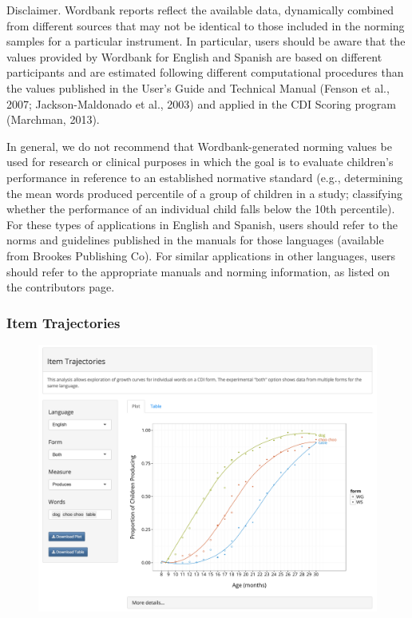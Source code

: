 \documentclass[man,noapacite]{apa2}
\begin{document}
Disclaimer. Wordbank reports reflect the available data, dynamically combined from different sources that may not be identical to those included in the norming samples for a particular instrument. In particular, users should be aware that the values provided by Wordbank for English and Spanish are based on different participants and are estimated following different computational procedures than the values published in the User’s Guide and Technical Manual (Fenson et al., 2007; Jackson-Maldonado et al., 2003) and applied in the CDI Scoring program (Marchman, 2013).

In general, we do not recommend that Wordbank-generated norming values be used for research or clinical purposes in which the goal is to evaluate children's performance in reference to an established normative standard (e.g., determining the mean words produced percentile of a group of children in a study; classifying whether the performance of an individual child falls below the 10th percentile). For these types of applications in English and Spanish, users should refer to the norms and guidelines published in the manuals for those languages (available from Brookes Publishing Co). For similar applications in other languages, users should refer to the appropriate manuals and norming information, as listed on the contributors page.

\subsubsection{Item Trajectories}

\begin{figure}[h!]
\includegraphics[width=6.5in]{figures/itemsapp.png}
\caption{\label{fig:items} }
\end{figure}
\end{document}
